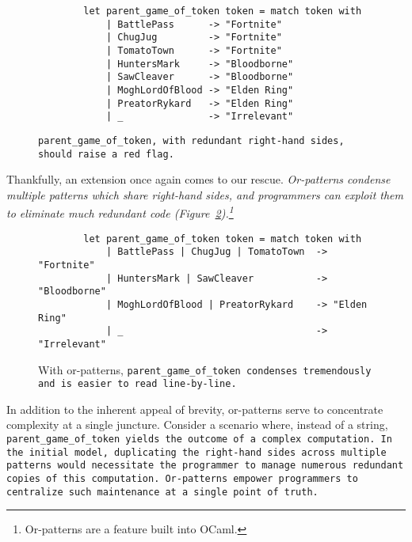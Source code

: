 \documentclass[manuscript,screen,review, 12pt]{acmart}
\begin{document}
\begin{outline}[enumerate]
        
        \begin{figure}
            \begin{center}
                \begin{verbatim}
        let parent_game_of_token token = match token with 
            | BattlePass      -> "Fortnite"
            | ChugJug         -> "Fortnite"
            | TomatoTown      -> "Fortnite"
            | HuntersMark     -> "Bloodborne"
            | SawCleaver      -> "Bloodborne"
            | MoghLordOfBlood -> "Elden Ring"
            | PreatorRykard   -> "Elden Ring"
            | _               -> "Irrelevant"
                \end{verbatim}
            \end{center}    

        \caption{\tt{parent\_game\_of\_token}, with redundant right-hand sides,
        should raise a red flag.} 
        \label{fig:barepgot}
        \end{figure}

Thankfully, an extension once again comes to our rescue. \it{Or-patterns}
condense multiple patterns which share right-hand sides, and programmers can
exploit them to eliminate much redundant code
(Figure~\ref{fig:orpgot}).\footnote{Or-patterns are a feature built into OCaml.}

    \begin{figure}
    \begin{center}
    \begin{verbatim}
        let parent_game_of_token token = match token with 
            | BattlePass | ChugJug | TomatoTown  -> "Fortnite"
            | HuntersMark | SawCleaver           -> "Bloodborne"
            | MoghLordOfBlood | PreatorRykard    -> "Elden Ring"
            | _                                  -> "Irrelevant"
    \end{verbatim}
    \end{center}    
    \caption{With or-patterns, \tt{parent\_game\_of\_token} condenses
    tremendously and is easier to read line-by-line.} 
    \label{fig:orpgot}
    \end{figure}

    In addition to the inherent appeal of brevity, or-patterns serve to
    concentrate complexity at a single juncture. Consider a scenario where,
    instead of a string, \tt{parent\_game\_of\_token} yields the outcome of a
    complex computation. In the initial model, duplicating the right-hand sides
    across multiple patterns would necessitate the programmer to manage numerous
    redundant copies of this computation. Or-patterns empower programmers to
    centralize such maintenance at a single point of truth.
    

\end{outline}
\end{document}
